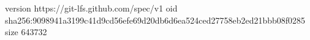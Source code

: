 version https://git-lfs.github.com/spec/v1
oid sha256:9098941a3199c41d9cd56efe69d20db6d6ea524ced27758eb2ed21bbb08f0285
size 643732
